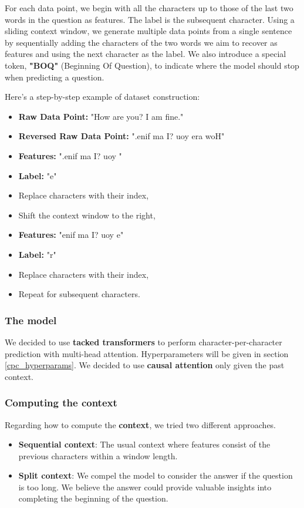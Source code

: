 \documentclass{article}
\begin{document}
For each data point, we begin with all the characters up to those of the last two words in the question as features. The label is the subsequent character. Using a sliding context window, we generate multiple data points from a single sentence by sequentially adding the characters of the two words we aim to recover as features and using the next character as the label. We also introduce a special token, \textbf{"BOQ"} (Beginning Of Question), to indicate where the model should stop when predicting a question.

Here's a step-by-step example of dataset construction:

\begin{itemize}
    \item \textbf{Raw Data Point:} "How are you? I am fine."
    \item \textbf{Reversed Raw Data Point:} ".enif ma I? uoy era woH"
    \item \textbf{Features:} ".enif ma I? uoy "
    \item \textbf{Label:} "e"
    \item Replace characters with their index,
    \item Shift the context window to the right,
    \item \textbf{Features:} "enif ma I? uoy e"
    \item \textbf{Label:} "r"
    \item Replace characters with their index,
    \item Repeat for subsequent characters.
\end{itemize}


\subsubsection{The model}
We decided to use \textbf{tacked transformers} to perform character-per-character prediction with multi-head attention. Hyperparameters will be given in section \ref{cpc_hyperparams}.
We decided to use \textbf{causal attention} only given the past context.

\subsubsection{Computing the context}

Regarding how to compute the \textbf{context}, we tried two different approaches.

\begin{itemize}
    \item \textbf{Sequential context}: The usual context where features consist of the previous characters within a window length.
    \item \textbf{Split context}: We compel the model to consider the answer if the question is too long. We believe the answer could provide valuable insights into completing the beginning of the question.
\end{itemize}
\end{document}
